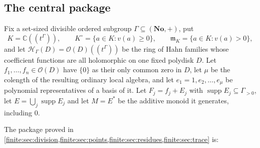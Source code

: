 \documentclass[11pt,letterpaper]{article}
\theoremstyle{definition}
\theoremstyle{remark}
\newcommand{\No}{\mathbf{No}}
\newcommand{\C}{\mathbb C}
\newcommand{\OO}{\mathcal O}
\newcommand{\HH}{\mathscr H}
\newcommand{\mm}{\mathfrak m}
\newcommand{\Kc}{K^{\circ}}
\DeclareMathOperator{\supp}{supp}
\numberwithin{equation}{section}
\begin{document}
\subsection{The central package}
\label{finite:sec:package}

Fix a set-sized divisible ordered subgroup $\Gamma\subseteq(\No,+)$, put
\[
 K=\C((t^\Gamma)),\qquad
 \Kc=\{a\in K:v(a)\geq0\},\qquad
 \mm_K=\{a\in K:v(a)>0\},
\]
and let $\HH_\Gamma(D)=\OO(D)((t^\Gamma))$ be the ring of Hahn families whose coefficient functions are all holomorphic on one fixed polydisk $D$. Let $f_1,\ldots,f_n\in\OO(D)$ have $\{0\}$ as their only common zero in $D$, let $\mu$ be the colength of the resulting ordinary local algebra, and let $e_1=1,e_2,\ldots,e_\mu$ be polynomial representatives of a basis of it. Let $F_j=f_j+E_j$ with $\supp E_j\subseteq\Gamma_{>0}$, let $E=\bigcup_j\supp E_j$ and let $M=E^*$ be the additive monoid it generates, including $0$.

The package proved in \cref{finite:sec:division,finite:sec:points,finite:sec:residues,finite:sec:trace} is:
\end{document}
